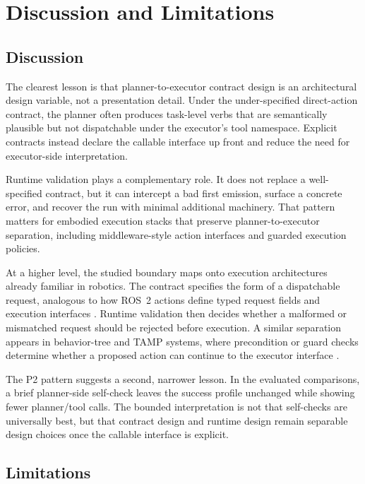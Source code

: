 \section{Discussion and Limitations}

\subsection{Discussion}

The clearest lesson is that planner-to-executor contract design is an
architectural design variable, not a presentation detail. Under the
under-specified direct-action contract, the
planner often produces task-level verbs that are semantically plausible but not
dispatchable under the executor's tool namespace. Explicit contracts instead
declare the callable interface up front and reduce the need for executor-side
interpretation.

Runtime validation plays a complementary role. It does not replace a
well-specified contract, but it can intercept a bad first emission, surface a
concrete error, and recover the run with minimal additional machinery. That
pattern matters for embodied execution stacks that preserve
planner-to-executor separation, including middleware-style action interfaces and
guarded execution policies.

At a higher level, the studied boundary maps onto execution architectures
already familiar in robotics. The contract specifies the form of a
dispatchable request, analogous to how ROS~2 actions define typed request
fields and execution interfaces
\cite{biggs2019ros2actions,macenski2022ros2,martin2021plansys2}. Runtime
validation then decides whether a malformed or mismatched request should be
rejected before execution. A similar separation appears in behavior-tree and
TAMP systems, where precondition or guard checks determine whether a proposed
action can continue to the executor interface
\cite{colledanchise2018behaviortrees,behaviortreecppdocs,behaviortreecppconditions,garrett2020pddlstream,garrett2021integratedtamp}.

The P2 pattern suggests a second, narrower lesson. In the evaluated
comparisons, a
brief planner-side self-check leaves the success profile unchanged while
showing fewer planner/tool calls. The bounded interpretation is not that
self-checks are universally best, but that contract design and runtime design
remain separable design choices once the callable interface is explicit.

\subsection{Limitations}

